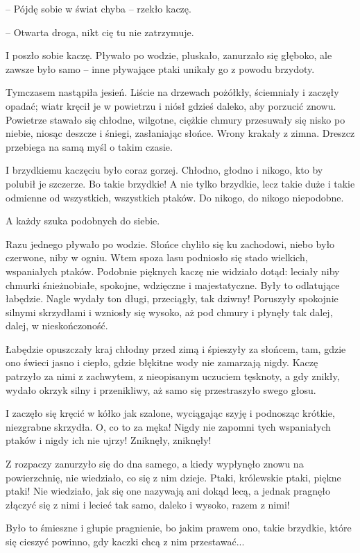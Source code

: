 \documentclass{book}
\begin{document}
-- Pójdę sobie w świat chyba -- rzekło kaczę.

-- Otwarta droga, nikt cię tu nie zatrzymuje.

I poszło sobie kaczę. Pływało po wodzie, pluskało, zanurzało się głęboko, ale zawsze było samo -- inne pływające ptaki unikały go z powodu brzydoty.

Tymczasem nastąpiła jesień. Liście na drzewach pożółkły, ściemniały i zaczęły opadać; wiatr kręcił je w powietrzu i niósł gdzieś daleko, aby porzucić znowu. Powietrze stawało się chłodne, wilgotne, ciężkie chmury przesuwały się nisko po niebie, niosąc deszcze i śniegi, zasłaniając słońce. Wrony krakały z zimna. Dreszcz przebiega na samą myśl o takim czasie.

I brzydkiemu kaczęciu było coraz gorzej. Chłodno, głodno i nikogo, kto by polubił je szczerze. Bo takie brzydkie! A nie tylko brzydkie, lecz takie duże i takie odmienne od wszystkich, wszystkich ptaków. Do nikogo, do nikogo niepodobne.

A każdy szuka podobnych do siebie.

Razu jednego pływało po wodzie. Słońce chyliło się ku zachodowi, niebo było czerwone, niby w ogniu. Wtem spoza lasu podniosło się stado wielkich, wspaniałych ptaków. Podobnie pięknych kaczę nie widziało dotąd: leciały niby chmurki śnieżnobiałe, spokojne, wdzięczne i majestatyczne. Były to odlatujące łabędzie. Nagle wydały ton długi, przeciągły, tak dziwny! Poruszyły spokojnie silnymi skrzydłami i wzniosły się wysoko, aż pod chmury i płynęły tak dalej, dalej, w nieskończoność.

Łabędzie opuszczały kraj chłodny przed zimą i śpieszyły za słońcem, tam, gdzie ono świeci jasno i ciepło, gdzie błękitne wody nie zamarzają nigdy. Kaczę patrzyło za nimi z zachwytem, z nieopisanym uczuciem tęsknoty, a gdy znikły, wydało okrzyk silny i przenikliwy, aż samo się przestraszyło swego głosu.

I zaczęło się kręcić w kółko jak szalone, wyciągając szyję i podnosząc krótkie, niezgrabne skrzydła. O, co to za męka! Nigdy nie zapomni tych wspaniałych ptaków i nigdy ich nie ujrzy! Zniknęły, zniknęły!

Z rozpaczy zanurzyło się do dna samego, a kiedy wypłynęło znowu na powierzchnię, nie wiedziało, co się z nim dzieje. Ptaki, królewskie ptaki, piękne ptaki! Nie wiedziało, jak się one nazywają ani dokąd lecą, a jednak pragnęło złączyć się z nimi i lecieć tak samo, daleko i wysoko, razem z nimi!

Było to śmieszne i głupie pragnienie, bo jakim prawem ono, takie brzydkie, które się cieszyć powinno, gdy kaczki chcą z nim przestawać...
\end{document}
